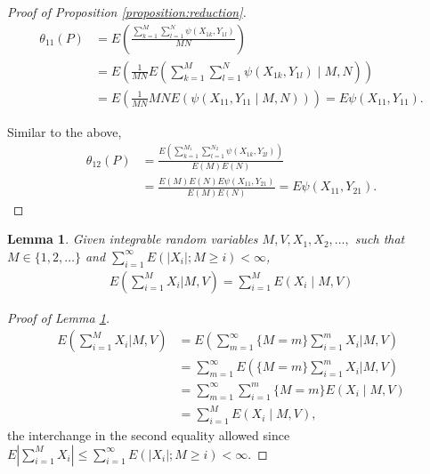 \documentclass[12pt]{article}
\DeclareMathOperator{\AUC}{AUC}
\newcommand{\E}{E}
\renewcommand{\P}{P}
\newcommand{\cind}{\perp \!\!\! \perp}
\newcommand{\aucindiv}{\theta_{11}}%
\newcommand{\aucpop}{\theta_{12}}%
\newcommand{\kernel}{\psi}
\newtheorem{lemma}[theorem]{Lemma}
\begin{document}
\begin{proof}[Proof of Proposition \ref{proposition:reduction}]
  \begin{align}
    \aucindiv(\P) &= \E\left(\frac{\sum_{k=1}^M\sum_{l=1}^N\kernel(X_{1k},Y_{1l})}{MN}\right)\\
                  &=\E\left(\frac{1}{MN}\E\left(\sum_{k=1}^M\sum_{l=1}^N\kernel(X_{1k},Y_{1l}) \mid M,N\right)\right)\\
                  &=\E\left(\frac{1}{MN}MN\E(\kernel(X_{11},Y_{11}\mid M,N))\right) = \E\kernel(X_{11},Y_{11}).
  \end{align}

  Similar to the above,
  \begin{align}
    \aucpop(\P) &= \frac{\E\left(\sum_{k=1}^{M_1}\sum_{l=1}^{N_2}\kernel(X_{1k},Y_{2l})\right)}{\E(M)\E(N)}\\
    &=\frac{\E(M)\E(N)\E\kernel(X_{11},Y_{21})}{\E(M)\E(N)} = \E\kernel(X_{11},Y_{21}).
  \end{align}
\end{proof}


\begin{lemma}\label{lemma:conditional wald}
  Given integrable random variables $M,V,X_1,X_2,\ldots,$ such that $M\in\{1,2,\ldots\}$ and $\sum_{i=1}^\infty E(|X_i|;M\ge i)<\infty$,
  \begin{align}
    \E\left(\sum_{i=1}^M X_i \bigg\vert M,V\right) = \sum_{i=1}^M \E(X_i\mid M,V)
  \end{align}
\end{lemma}
\begin{proof}[Proof of Lemma \ref{lemma:conditional wald}]
  \begin{align}
    \E\left(\sum_{i=1}^M X_i\bigg\vert M,V\right)
    &=  \E\left(\sum_{m=1}^\infty\{M=m\}\sum_{i=1}^m X_i\bigg\vert M,V\right)\\
    &= \sum_{m=1}^\infty \E\left(\{M=m\}\sum_{i=1}^m X_i\bigg\vert M,V\right)\\
    &=\sum_{m=1}^\infty \sum_{i=1}^m\{M=m\}\E(X_i\mid M,V)\\
    &=\sum_{i=1}^M\E(X_i\mid M,V),
  \end{align}
the interchange in the second equality allowed since $E\left|\sum_{i=1}^MX_i\right| \le \sum_{i=1}^\infty E(|X_i|;M\ge i)<\infty.$
\end{proof}
\end{document}
